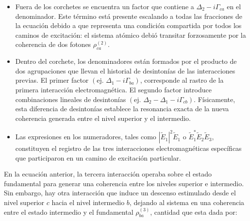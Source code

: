 \documentclass[12pt,a4paper]{article}
\begin{document}
\begin{itemize}
    \item Fuera de los corchetes se encuentra un factor que contiene a $\Delta_2 - i\Gamma_{ca}$ en el denominador. Este término está presente escalando a todas las fracciones de la ecuación debido a que representa una condición compartida por todos los caminos de excitación: el sistema atómico debió transitar forzosamente por la coherencia de dos fotones $\rho_{ca}^{(2)}$. 
    
    \item Dentro del corchete, los denominadores están formados por el producto de dos agrupaciones que llevan el historial de desintonías de las interacciones previas. El primer factor $(\text{ej. }\Delta_1 - i\Gamma_{ba})$, corresponde al rastro de la primera interacción electromagnética. El segundo factor introduce combinaciones lineales de desintonías $(\text{ej. }\Delta_2 - \Delta_1 - i\Gamma_{cb})$. Físicamente, esta diferencia de desintonías establece la resonancia exacta de la nueva coherencia generada entre el nivel superior y el intermedio.
    
    \item Las expresiones en los numeradores, tales como $|\tilde{E}_1|^2 \tilde{E}_1$ o $\tilde{E}_1^* \tilde{E}_2 \tilde{E}_3$, constituyen el registro de las tres interacciones electromagnéticas específicas que participaron en un camino de excitación particular.
\end{itemize}

En la ecuación anterior, la tercera interacción operaba sobre el estado fundamental para generar una coherencia entre los niveles superior e intermedio. Sin embargo, hay otra interacción que induce un descenso estimulado desde el nivel superior $c$ hacia el nivel intermedio $b$, dejando al sistema en una coherencia entre el estado intermedio y el fundamental $\rho_{ba}^{(3)}$, cantidad que esta dada por: 
\end{document}
